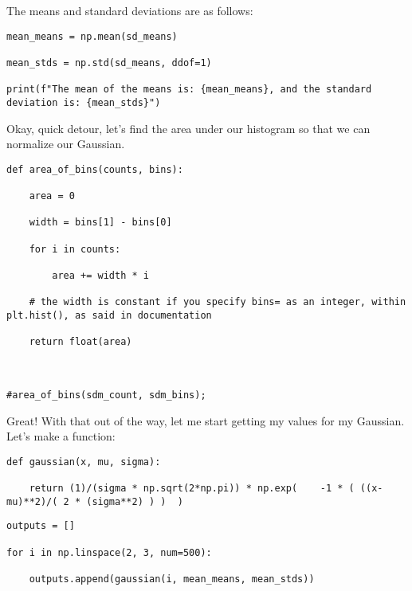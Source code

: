\documentclass[12pt]{article}
\begin{document}
The means and standard deviations are as follows:

\bigskip
 
\begin{lstlisting}[frame=shadowbox]
mean_means = np.mean(sd_means)

mean_stds = np.std(sd_means, ddof=1)

print(f"The mean of the means is: {mean_means}, and the standard deviation is: {mean_stds}")
\end{lstlisting}
\medskip

Okay, quick detour, let's find the area under our histogram so that we can normalize our Gaussian.

\bigskip
 
\begin{lstlisting}[frame=shadowbox]
def area_of_bins(counts, bins):

    area = 0

    width = bins[1] - bins[0]

    for i in counts:

        area += width * i

    # the width is constant if you specify bins= as an integer, within plt.hist(), as said in documentation

    return float(area)

    

#area_of_bins(sdm_count, sdm_bins);
\end{lstlisting}
\medskip

Great! With that out of the way, let me start getting my values for my Gaussian. Let's make a function:

\bigskip
 
\begin{lstlisting}[frame=shadowbox]
def gaussian(x, mu, sigma):

    return (1)/(sigma * np.sqrt(2*np.pi)) * np.exp(    -1 * ( ((x-mu)**2)/( 2 * (sigma**2) ) )  )
\end{lstlisting}
\medskip
\bigskip
 
\begin{lstlisting}[frame=shadowbox]
outputs = []

for i in np.linspace(2, 3, num=500):

    outputs.append(gaussian(i, mean_means, mean_stds))
\end{lstlisting}
\medskip
\bigskip
 
\begin{lstlisting}[frame=shadowbox]

\end{lstlisting}
\medskip
\end{document}
